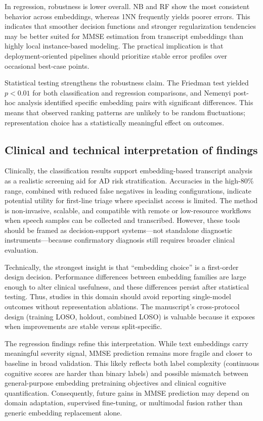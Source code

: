 \documentclass[final,5p,times]{elsarticle}
\begin{document}
In regression, robustness is lower overall. NB and RF show the most consistent behavior across embeddings, whereas 1NN frequently yields poorer errors. This indicates that smoother decision functions and stronger regularization tendencies may be better suited for MMSE estimation from transcript embeddings than highly local instance-based modeling. The practical implication is that deployment-oriented pipelines should prioritize stable error profiles over occasional best-case points.

Statistical testing strengthens the robustness claim. The Friedman test yielded $p < 0.01$ for both classification and regression comparisons, and Nemenyi post-hoc analysis identified specific embedding pairs with significant differences. This means that observed ranking patterns are unlikely to be random fluctuations; representation choice has a statistically meaningful effect on outcomes.

\subsection{Clinical and technical interpretation of findings}
\label{subsec:clinical_technical_interpretation}

Clinically, the classification results support embedding-based transcript analysis as a realistic screening aid for AD risk stratification. Accuracies in the high-80\% range, combined with reduced false negatives in leading configurations, indicate potential utility for first-line triage where specialist access is limited. The method is non-invasive, scalable, and compatible with remote or low-resource workflows when speech samples can be collected and transcribed. However, these tools should be framed as decision-support systems---not standalone diagnostic instruments---because confirmatory diagnosis still requires broader clinical evaluation.

Technically, the strongest insight is that ``embedding choice'' is a first-order design decision. Performance differences between embedding families are large enough to alter clinical usefulness, and these differences persist after statistical testing. Thus, studies in this domain should avoid reporting single-model outcomes without representation ablations. The manuscript’s cross-protocol design (training LOSO, holdout, combined LOSO) is valuable because it exposes when improvements are stable versus split-specific.

The regression findings refine this interpretation. While text embeddings carry meaningful severity signal, MMSE prediction remains more fragile and closer to baseline in broad validation. This likely reflects both label complexity (continuous cognitive scores are harder than binary labels) and possible mismatch between general-purpose embedding pretraining objectives and clinical cognitive quantification. Consequently, future gains in MMSE prediction may depend on domain adaptation, supervised fine-tuning, or multimodal fusion rather than generic embedding replacement alone.
\end{document}
